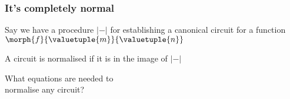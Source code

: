 \begin{frame}
    \frametitle{It's completely normal}

    \centering
    \LARGE

    \await

    Say we have a procedure \(\lvert-\rvert\) for
    establishing a \alert{canonical circuit} for a function
    \(\morph{f}{\valuetuple{m}}{\valuetuple{n}}\)

    \await

    \vspace{1em}

    A circuit is \alert{normalised} if it is in the image of \(\lvert-\rvert\)

    \await

    \vspace{1em}

    What equations are needed to \\ normalise any circuit?

\end{frame}
